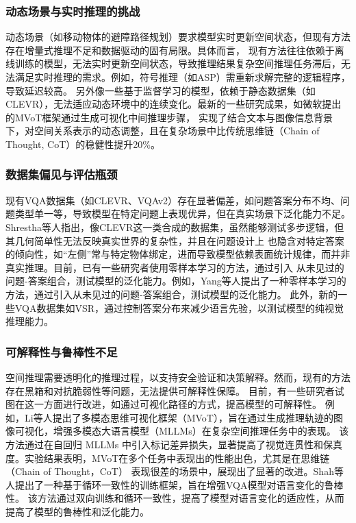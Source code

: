 \subsubsection{动态场景与实时推理的挑战}
动态场景（如移动物体的避障路径规划）要求模型实时更新空间状态，但现有方法存在增量式推理不足和数据驱动的固有局限。具体而言，
现有方法往往依赖于离线训练的模型，无法实时更新空间状态，导致推理结果复杂空间推理任务滞后，无法满足实时推理的需求。例如，符号推理（如ASP）需重新求解完整的逻辑程序，导致延迟较高\cite{}。
另外像一些基于监督学习的模型，依赖于静态数据集（如CLEVR），无法适应动态环境中的连续变化。最新的一些研究成果，如微软提出的MVoT框架通过生成可视化中间推理步骤，
实现了结合文本与图像信息背景下，对空间关系表示的动态调整，且在复杂场景中比传统思维链（Chain of Thought, CoT）的稳健性提升20\%。

\subsubsection{数据集偏见与评估瓶颈}
现有VQA数据集（如CLEVR、VQAv2）存在显著偏差，如问题答案分布不均、问题类型单一等，导致模型在特定问题上表现优异，但在真实场景下泛化能力不足。
Shrestha\cite{shrestha2019answer}等人指出，像CLEVR这一类合成的数据集，虽然能够测试多步逻辑，但其几何简单性无法反映真实世界的复杂性，并且在问题设计上
也隐含对特定答案的倾向性，如“左侧”常与特定物体绑定，进而导致模型依赖表面统计规律，而并非真实推理。目前，已有一些研究者使用零样本学习的方法，通过引入
从未见过的问题-答案组合，测试模型的泛化能力。例如，Yang\cite{yang-etal-2022-zero}等人提出了一种零样本学习的方法，通过引入从未见过的问题-答案组合，测试模型的泛化能力。
此外，新的一些VQA数据集如VSR，通过控制答案分布来减少语言先验，以测试模型的纯视觉推理能力。

\subsubsection{可解释性与鲁棒性不足}
空间推理需要透明化的推理过程，以支持安全验证和决策解释。然而，现有的方法存在黑箱和对抗脆弱性等问题，无法提供可解释性保障。
目前，有一些研究者试图在这一方面进行改进，如通过可视化路径的方式，提高模型的可解释性。
例如，Li\cite{li2025imagine}等人提出了多模态思维可视化框架（MVoT），旨在通过生成推理轨迹的图像可视化，增强多模态大语言模型（MLLMs）在复杂空间推理任务中的表现。
该方法通过在自回归 MLLMs 中引入标记差异损失，显著提高了视觉连贯性和保真度。实验结果表明，MVoT在多个任务中表现出的性能出色，尤其是在思维链（Chain of Thought，CoT）
表现很差的场景中，展现出了显著的改进。Shah\cite{shah2019cycle}等人提出了一种基于循环一致性的训练框架，旨在增强VQA模型对语言变化的鲁棒性。
该方法通过双向训练和循环一致性，提高了模型对语言变化的适应性，从而提高了模型的鲁棒性和泛化能力。


